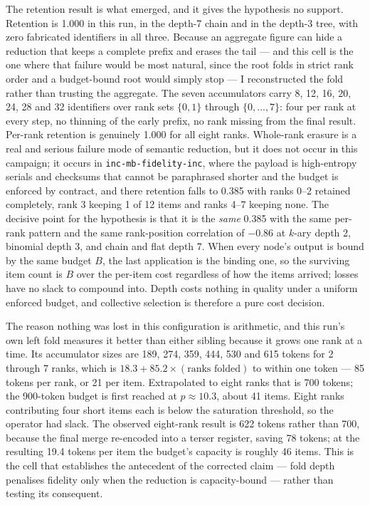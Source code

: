 \documentclass[11pt]{article}
\begin{document}
The retention result is what emerged, and it gives the hypothesis no support. Retention
is 1.000 in this run, in the depth-7 chain and in the depth-3 tree, with zero fabricated
identifiers in all three. Because an aggregate figure can hide a reduction that keeps a
complete prefix and erases the tail --- and this cell is the one where that failure would
be most natural, since the root folds in strict rank order and a budget-bound root would
simply stop --- I reconstructed the fold rather than trusting the aggregate. The seven
accumulators carry 8, 12, 16, 20, 24, 28 and 32 identifiers over rank sets
$\{0,1\}$ through $\{0,\dots,7\}$: four per rank at every step, no thinning of the early
prefix, no rank missing from the final result. Per-rank retention is genuinely 1.000 for
all eight ranks. Whole-rank erasure is a real and serious failure mode of semantic
reduction, but it does not occur in this campaign; it occurs in
\texttt{inc-mb-fidelity-inc}, where the payload is high-entropy serials and checksums
that cannot be paraphrased shorter and the budget is enforced by contract, and there
retention falls to 0.385 with ranks 0--2 retained completely, rank 3 keeping 1 of 12
items and ranks 4--7 keeping none. The decisive point for the hypothesis is that it is
the \emph{same} 0.385 with the same per-rank pattern and the same rank-position
correlation of $-0.86$ at $k$-ary depth 2, binomial depth 3, and chain and flat depth 7.
When every node's output is bound by the same budget $B$, the last application is the
binding one, so the surviving item count is $B$ over the per-item cost regardless of how
the items arrived; losses have no slack to compound into. Depth costs nothing in quality
under a uniform enforced budget, and collective selection is therefore a pure cost
decision.

The reason nothing was lost in this configuration is arithmetic, and this run's own left
fold measures it better than either sibling because it grows one rank at a time. Its
accumulator sizes are 189, 274, 359, 444, 530 and 615 tokens for 2 through 7 ranks,
which is $18.3 + 85.2 \times (\text{ranks folded})$ to within one token --- 85 tokens
per rank, or 21 per item. Extrapolated to eight ranks that is 700 tokens; the 900-token
budget is first reached at $p \approx 10.3$, about 41 items. Eight ranks contributing
four short items each is below the saturation threshold, so the operator had slack. The
observed eight-rank result is 622 tokens rather than 700, because the final merge
re-encoded into a terser register, saving 78 tokens; at the resulting 19.4 tokens per
item the budget's capacity is roughly 46 items. This is the cell that establishes the
antecedent of the corrected claim --- fold depth penalises fidelity only when the
reduction is capacity-bound --- rather than testing its consequent.
\end{document}
